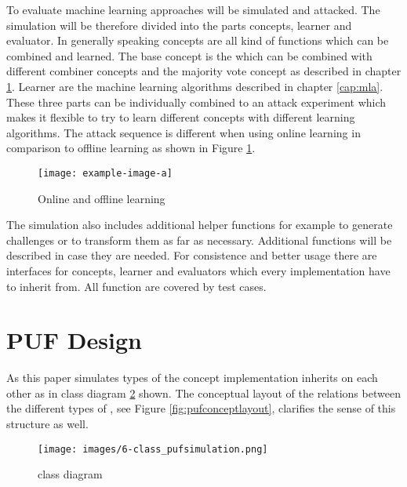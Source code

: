 
To evaluate machine learning approaches \pufs will be simulated and attacked.
The simulation will be therefore divided into the parts concepts, learner and evaluator.
In generally speaking concepts are all kind of functions which can be combined and learned.
The base concept is the \apuf which can be combined with different combiner concepts and the majority vote concept as described in chapter \ref{sec:pufsimulation}.
Learner are the machine learning algorithms described in chapter \ref{cap:mla}.
These three parts can be individually combined to an attack experiment which makes it flexible to try to learn different concepts with different learning algorithms.
The attack sequence is different when using online learning in comparison to offline learning as shown in Figure \ref{fig:attackflow}.

\begin{figure}[ht]
\noindent\texttt{[image: example-image-a]}
\caption{Online and offline learning}
\label{fig:attackflow}
\end{figure}

The simulation also includes additional helper functions for example to generate challenges or to transform them as far as necessary.
Additional functions will be described in case they are needed.
For consistence and better usage there are interfaces for concepts, learner and evaluators which every implementation have to inherit from.
All function are covered by test cases.


\section{\ac{PUF} Design}
\label{sec:pufsimulation}

As this paper simulates types of \apufs the concept implementation inherits on each other as in class diagram \ref{class:pufsimulation} shown. The conceptual layout of the relations between the different types of \apufs, see Figure \ref{fig:pufconceptlayout}, clarifies the sense of this structure as well.

\begin{figure}[ht]
\texttt{[image: images/6-class\_pufsimulation.png]}
\caption{\apufs class diagram}
\label{class:pufsimulation}
\end{figure}

